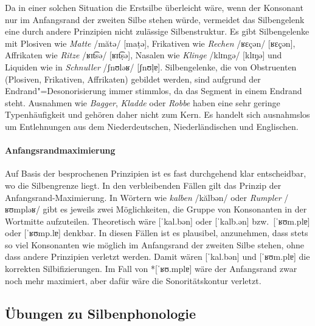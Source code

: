 Da in einer solchen Situation die Erstsilbe überleicht wäre, wenn der Konsonant nur im Anfangsrand der zweiten Silbe stehen würde, vermeidet das Silbengelenk eine durch andere Prinzipien nicht zulässige Silbenstruktur.
Es gibt Silbengelenke mit Plosiven wie \textit{Matte} /mătə/ [maṭə], Frikativen wie \textit{Rechen} /ʁɛçən/ [ʁɛç̣ən], Affrikaten wie \textit{Ritze} /ʁɪt͡sə/ [ʁɪt͡ṣə], Nasalen wie \textit{Klinge} /klɪngə/ [klɪŋ̣ə] und Liquiden wie in \textit{Schnuller} /ʃnʊləʁ/ [ʃnʊḷɐ].
Silbengelenke, die von Obstruenten (Plosiven, Frikativen, Affrikaten) gebildet werden, sind aufgrund der Endrand"=Desonorisierung immer stimmlos, da das Segment in einem Endrand steht.
Ausnahmen wie \textit{Bagger}, \textit{Kladde} oder \textit{Robbe} haben eine sehr geringe Typenhäufigkeit und gehören daher nicht zum Kern.
Es handelt sich ausnahmslos um Entlehnungen aus dem Niederdeutschen, Niederländischen und Englischen.

\paragraph*{Anfangsrandmaximierung}

Auf Basis der besprochenen Prinzipien ist es fast durchgehend klar entscheidbar, wo die Silbengrenze liegt.
In den verbleibenden Fällen gilt das Prinzip der Anfangsrand-Maximierung.
In Wörtern wie \textit{kalben} /kălbən/ oder \textit{Rumpler} /ʁʊmpləʁ/ gibt es jeweils zwei Möglichkeiten, die Gruppe von Konsonanten in der Wortmitte aufzuteilen.
Theoretisch wäre [ˈkal.bən] oder [ˈkalb.ən] bzw.\ [ˈʁʊm.plɐ] oder [ˈʁʊmp.lɐ] denkbar.
In diesen Fällen ist es plausibel, anzunehmen, dass stets so viel Konsonanten wie möglich im Anfangsrand der zweiten Silbe stehen, ohne dass andere Prinzipien verletzt werden.
Damit wären [ˈkal.bən] und [ˈʁʊm.plɐ] die korrekten Silbifizierungen.
Im Fall von *[ˈʁʊ.mplɐ] wäre der Anfangsrand zwar noch mehr maximiert, aber dafür wäre die Sonoritätskontur verletzt.


\subsection{Übungen zu Silbenphonologie}

\vspace{\baselineskip}


